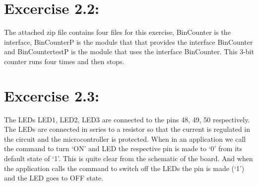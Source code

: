 \documentclass[11pt]{article} %
\begin{document}
\section*{Excercise 2.2:}
The attached zip file contains four files for this exercise, BinCounter is the interface, BinCounterP is the module that that provides the interface BinCounter and BinCountertestP is the module that uses the interface BinCounter. This 3-bit counter runs four times and then stops.

\section*{Excercise 2.3:}
The LEDs LED1, LED2, LED3 are connected to the pins 48, 49, 50 respectively. The LEDs are connected in series to a resistor so that the current is regulated in the circuit and the microcontroller is protected. When in an application we call the command to turn `ON' and LED the respective pin is made to `0' from its default state of `1'. This is quite clear from the schematic of the board. And when the application calls the command to switch off the LEDs the pin is made (`1') and the LED goes to OFF state.
\end{document}
